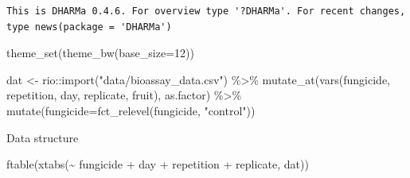 \documentclass[
  letterpaper,
  DIV=11,
  numbers=noendperiod]{scrreport}
\newenvironment{Shaded}{\begin{snugshade}}{\end{snugshade}}
\newcommand{\AttributeTok}[1]{\textcolor[rgb]{0.40,0.45,0.13}{#1}}
\newcommand{\DecValTok}[1]{\textcolor[rgb]{0.68,0.00,0.00}{#1}}
\newcommand{\FunctionTok}[1]{\textcolor[rgb]{0.28,0.35,0.67}{#1}}
\newcommand{\NormalTok}[1]{\textcolor[rgb]{0.00,0.23,0.31}{#1}}
\newcommand{\OtherTok}[1]{\textcolor[rgb]{0.00,0.23,0.31}{#1}}
\newcommand{\SpecialCharTok}[1]{\textcolor[rgb]{0.37,0.37,0.37}{#1}}
\newcommand{\StringTok}[1]{\textcolor[rgb]{0.13,0.47,0.30}{#1}}
\begin{document}
\begin{verbatim}
This is DHARMa 0.4.6. For overview type '?DHARMa'. For recent changes, type news(package = 'DHARMa')
\end{verbatim}

\begin{Shaded}
\begin{Highlighting}[]
\FunctionTok{theme\_set}\NormalTok{(}\FunctionTok{theme\_bw}\NormalTok{(}\AttributeTok{base\_size=}\DecValTok{12}\NormalTok{))}
\end{Highlighting}
\end{Shaded}

\begin{Shaded}
\begin{Highlighting}[]
\NormalTok{dat }\OtherTok{\textless{}{-}}\NormalTok{ rio}\SpecialCharTok{::}\FunctionTok{import}\NormalTok{(}\StringTok{"data/bioassay\_data.csv"}\NormalTok{) }\SpecialCharTok{\%\textgreater{}\%}
  \FunctionTok{mutate\_at}\NormalTok{(}\FunctionTok{vars}\NormalTok{(fungicide, repetition, day, replicate, fruit), as.factor) }\SpecialCharTok{\%\textgreater{}\%} 
  \FunctionTok{mutate}\NormalTok{(}\AttributeTok{fungicide=}\FunctionTok{fct\_relevel}\NormalTok{(fungicide, }\StringTok{"control"}\NormalTok{))}
\end{Highlighting}
\end{Shaded}

Data structure

\begin{Shaded}
\begin{Highlighting}[]
\FunctionTok{ftable}\NormalTok{(}\FunctionTok{xtabs}\NormalTok{(}\SpecialCharTok{\textasciitilde{}}\NormalTok{ fungicide }\SpecialCharTok{+}\NormalTok{ day }\SpecialCharTok{+}\NormalTok{ repetition }\SpecialCharTok{+}\NormalTok{ replicate, dat))}
\end{Highlighting}
\end{Shaded}
\end{document}

